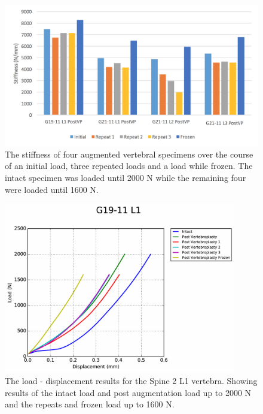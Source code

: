\begin{figure}[!h]
  \centering
 
\includegraphics[width=6in]{Chapters/Chapter_HT_images/experimental_repeats.png}
  \caption{The stiffness of four augmented vertebral specimens over the course
    of an initial load, three repeated loads and a load while frozen. The
intact specimen was loaded until 2000 N while the remaining four were loaded
until 1600 N.}
  \label{fig:exp_repeats}
\end{figure}


\begin{figure}[ht!]
  \centering
  \includegraphics[width=4in]{Chapters/Chapter_HT_images/G19-11_L1.pdf}
  \caption{The load - displacement results for the Spine 2 L1 vertebra. Showing
    results of the intact load and post augmentation load up to 2000 N and the
    repeats and frozen load up to 1600 N.}
  \label{fig:Spine2_L1}
\end{figure}

